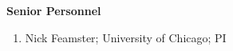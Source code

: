 \begin{center}
{\large \bf \TITLE}
\end{center}

\begin{center}
    {\bf Senior Personnel}
\end{center}


\begin{enumerate}
    \itemsep=-1pt
    \item Nick Feamster; University of Chicago; PI
\end{enumerate}
